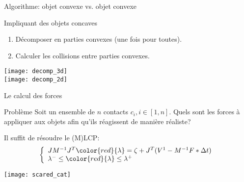 \begin{frame}{Algorithme: objet convexe vs. objet convexe}
\end{frame}

\begin{frame}{Impliquant des objets concaves}
    \begin{enumerate}
        \item Décomposer en parties convexes (une fois pour toutes).
        \item Calculer les collisions entre parties convexes.
    \end{enumerate}
    \begin{center}
        \texttt{[image: decomp\_3d]}\\
        \texttt{[image: decomp\_2d]}
    \end{center}
\end{frame}

\begin{frame}{Le calcul des forces}
    \begin{block}{Problème}
         Soit un ensemble de $n$ contacts $c_i, i \in [1, n]$. Quels sont les
         forces à appliquer aux objets afin qu’ils réagissent de manière
         réaliste?
    \end{block}
    \pause
    Il suffit de résoudre le (M)LCP:
    \[
    \left\{
        \begin{array}{l}
            JM^{-1}J^T {\color{red}{\lambda}} = \zeta +
            J^T(V^1 - M^{-1}F * \Delta t)\\
            \lambda^- \leq {\color{red}{\lambda}} \leq \lambda^+ %
        \end{array}
    \right.
    \]
    \begin{center}
        \texttt{[image: scared\_cat]}
    \end{center}
\end{frame}
